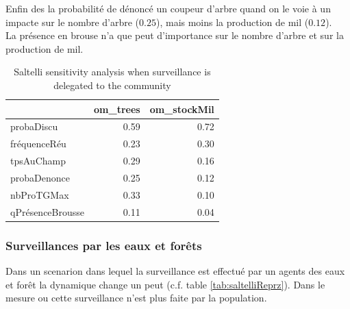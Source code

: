 \documentclass{article}
\begin{document}
        Enfin des la probabilité de dénoncé un coupeur d'arbre quand on le voie à un impacte sur le nombre d'arbre ($0.25$), mais moins la production de mil ($0.12$).\\

        La présence en brouse n'a que peut d'importance sur le nombre d'arbre et sur la production de mil. 

        \begin{table}
            \centering\begingroup\fontsize{10}{12}\selectfont
            
                \begin{tabular}[]{lrr}
                    \toprule
                    ~ & om\_trees & om\_stockMil\\
                    \hline
                    \addlinespace
                    probaDiscu & 0.59 & 0.72\\
                    fréquenceRéu & 0.23 & 0.30\\
                    tpsAuChamp & 0.29 & 0.16\\
                    probaDenonce & 0.25 & 0.12\\
                    nbProTGMax & 0.33 & 0.10\\
                    qPrésenceBrousse & 0.11 & 0.04\\
                    \bottomrule
                \end{tabular}
            \caption{Saltelli sensitivity analysis when surveillance is delegated to the community}
            \label{tab:saltelliCom}
            \endgroup{}
        \end{table}

    \subsubsection{Surveillances par les eaux et forêts}

        Dans un scenarion dans lequel la surveillance est effectué par un agents des eaux et forêt la dynamique change un peut (c.f. table \ref{tab:saltelliReprz}). Dans le mesure ou cette surveillance n'est plus faite par la population. 
\end{document}
